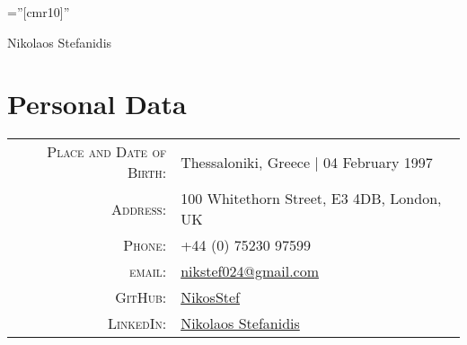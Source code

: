 \documentclass[a4paper,10pt]{article}
\begin{document}
\pagestyle{empty}

\font\fb=''[cmr10]''

\par{\centering
		{\Huge Nikolaos Stefanidis
	}\bigskip\par}

\section{Personal Data}

\begin{tabular}{rl}
    \textsc{Place and Date of Birth:} & Thessaloniki, Greece  | 04 February 1997 \\
    \textsc{Address:}   & 100 Whitethorn Street, E3 4DB, London, UK \\
    \textsc{Phone:}     & +44 (0) 75230 97599 \\
    \textsc{email:}     & \href{mailto:nikstef024@gmail.com}{nikstef024@gmail.com} \\
    \textsc{GitHub:}    & \href{https://github.com/NikosStef}{NikosStef} \\
    \textsc{LinkedIn:}  & \href{https://www.linkedin.com/in/nikolaos-stefanidis-b27aa711a/}{Nikolaos Stefanidis}
\end{tabular}

\end{document}
